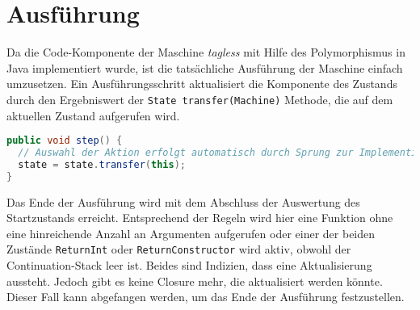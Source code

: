 \section{Ausführung}

Da die Code-Komponente der Maschine \textit{tagless} mit Hilfe des Polymorphismus in Java implementiert wurde, ist die tatsächliche Ausführung der Maschine einfach umzusetzen.
Ein Ausführungsschritt aktualisiert die Komponente des Zustands durch den Ergebniswert der \texttt{State transfer(Machine)} Methode, die auf dem aktuellen Zustand aufgerufen wird.

\begin{lstlisting}[language=java]
public void step() {
  // Auswahl der Aktion erfolgt automatisch durch Sprung zur Implementierung.
  state = state.transfer(this);
}
\end{lstlisting}

Das Ende der Ausführung wird mit dem Abschluss der Auswertung des Startzustands erreicht.
Entsprechend der Regeln wird hier eine Funktion ohne eine hinreichende Anzahl an Argumenten aufgerufen oder einer der beiden Zustände \texttt{ReturnInt} oder \texttt{ReturnConstructor} wird aktiv, obwohl der Continuation-Stack leer ist.
Beides sind Indizien, dass eine Aktualisierung aussteht.
Jedoch gibt es keine Closure mehr, die aktualisiert werden könnte.
Dieser Fall kann abgefangen werden, um das Ende der Ausführung festzustellen.


